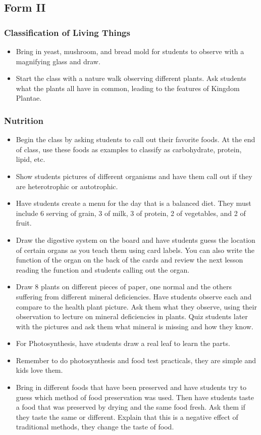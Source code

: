 \subsection{Form II}
\subsubsection{Classification of Living Things}
\begin{itemize}
\item Bring in yeast, mushroom, and bread mold for students to observe with a magnifying glass and draw.
\item Start the class with a nature walk observing different plants. Ask students what the plants all have in common, leading to the features of Kingdom Plantae.
\end{itemize}

\subsubsection{Nutrition}
\begin{itemize}
\item Begin the class by asking students to call out their favorite foods.  At the end of class, use these foods as examples to classify as carbohydrate, protein, lipid, etc.
\item Show students pictures of different organisms and have them call out if they are heterotrophic or autotrophic.
\item Have students create a menu for the day that is a balanced diet. They must include 6 serving of grain, 3 of milk, 3 of protein, 2 of vegetables, and 2 of fruit.  
\item Draw the digestive system on the board and have students guess the location of certain organs as you teach them using card labels.  You can also write the function of the organ on the back of the cards and review the next lesson reading the function and students calling out the organ.
\item Draw 8 plants on different pieces of paper, one normal and the others suffering from different mineral deficiencies. Have students observe each and compare to the health plant picture.  Ask them what they observe, using their observation to lecture on mineral deficiencies in plants. Quiz students later with the pictures and ask them what mineral is missing and how they know.  
\item	For Photosynthesis, have students draw a real leaf to learn the parts.
\item Remember to do photosynthesis and food test practicals, they are simple and kids love them.
\item Bring in different foods that have been preserved and have students try to guess which method of food preservation was used. Then have students taste a food that was preserved by drying and the same food fresh.  Ask them if they taste the same or different. Explain that this is a negative effect of traditional methods, they change the taste of food.
\end{itemize}


